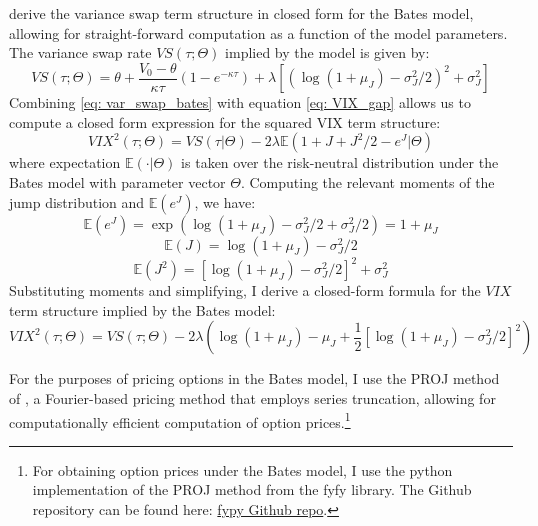 \documentclass[12pt]{article}
\begin{document}
\cite{broadie2008effect} derive the variance swap term structure in closed form for the Bates model, allowing for straight-forward computation as a function of the model parameters. The variance swap rate $VS(\tau; \Theta)$ implied by the model is given by:
\begin{equation}\label{eq: var_swap_bates}
VS(\tau; \Theta) =\theta+\frac{V_0-\theta}{\kappa \tau}\left(1-e^{-\kappa \tau}\right) + \lambda \left[(\log(1+\mu_J) - \sigma^2_J/2)^2 + \sigma_J^2\right]
\end{equation}
Combining \eqref{eq: var_swap_bates} with equation \eqref{eq: VIX_gap} allows us to compute a closed form expression for the squared VIX term structure:
$$VIX^2(\tau; \Theta) = VS(\tau\vert \Theta) - 2\lambda\mathbb{E}(1 + J + J^2/2 - e^J\vert \Theta)$$ 
where expectation $\mathbb{E}(\cdot\vert \Theta)$ is taken over the risk-neutral distribution under the Bates model with parameter vector $\Theta$. Computing the relevant moments of the jump distribution and $\mathbb{E}(e^J)$, we have: 
$$\mathbb{E}(e^J) = \exp(\log(1 + \mu_J)-\sigma^2_J/2 + \sigma^2_J/2) = 1+\mu_J$$
$$\mathbb{E}(J) = \log(1 + \mu_J)-\sigma^2_J/2 $$
$$\mathbb{E}(J^2) = \left[\log(1 + \mu_J) - \sigma^2_J/2\right]^2 + \sigma^2_J$$
Substituting moments and simplifying, I derive a closed-form formula for the $VIX$ term structure implied by the Bates model: 
\begin{equation}\label{eq: bates_VIX}
VIX^2(\tau; \Theta)  = VS(\tau; \Theta) - 2\lambda\left(\log(1+\mu_J) - \mu_J + \frac{1}{2}[\log(1+\mu_J) - \sigma_J^2/2]^2\right)
\end{equation}

For the purposes of pricing options in the Bates model, I use the PROJ method of \cite{kirkby2015efficient}, a Fourier-based pricing method that employs series truncation, allowing for computationally efficient computation of option prices.\footnote{For obtaining option prices under the Bates model, I use the python implementation of the PROJ method from the fyfy library. The Github repository can be found here: \href{https://github.com/jkirkby3/fypy}{fypy Github repo}.}
\end{document}
